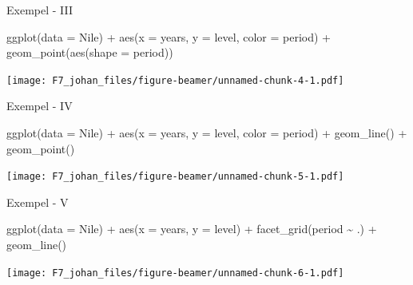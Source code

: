 \documentclass[
  11pt,
  ignorenonframetext,
  handout]{beamer}
\newenvironment{Shaded}{\begin{snugshade}}{\end{snugshade}}
\newcommand{\AttributeTok}[1]{\textcolor[rgb]{0.77,0.63,0.00}{#1}}
\newcommand{\FunctionTok}[1]{\textcolor[rgb]{0.00,0.00,0.00}{#1}}
\newcommand{\NormalTok}[1]{#1}
\newcommand{\SpecialCharTok}[1]{\textcolor[rgb]{0.00,0.00,0.00}{#1}}
\begin{document}
\begin{frame}[fragile]{Exempel - III}
\protect\hypertarget{exempel---iii}{}
\begin{Shaded}
\begin{Highlighting}[]
\FunctionTok{ggplot}\NormalTok{(}\AttributeTok{data =}\NormalTok{ Nile) }\SpecialCharTok{+} 
  \FunctionTok{aes}\NormalTok{(}\AttributeTok{x =}\NormalTok{ years, }\AttributeTok{y =}\NormalTok{ level, }\AttributeTok{color =}\NormalTok{ period) }\SpecialCharTok{+} 
  \FunctionTok{geom\_point}\NormalTok{(}\FunctionTok{aes}\NormalTok{(}\AttributeTok{shape =}\NormalTok{ period))}
\end{Highlighting}
\end{Shaded}

\texttt{[image: F7\_johan\_files/figure-beamer/unnamed-chunk-4-1.pdf]}
\end{frame}

\begin{frame}[fragile]{Exempel - IV}
\protect\hypertarget{exempel---iv}{}
\begin{Shaded}
\begin{Highlighting}[]
\FunctionTok{ggplot}\NormalTok{(}\AttributeTok{data =}\NormalTok{ Nile) }\SpecialCharTok{+} 
  \FunctionTok{aes}\NormalTok{(}\AttributeTok{x =}\NormalTok{ years, }\AttributeTok{y =}\NormalTok{ level, }\AttributeTok{color =}\NormalTok{ period) }\SpecialCharTok{+} 
  \FunctionTok{geom\_line}\NormalTok{() }\SpecialCharTok{+}
  \FunctionTok{geom\_point}\NormalTok{()}
\end{Highlighting}
\end{Shaded}

\texttt{[image: F7\_johan\_files/figure-beamer/unnamed-chunk-5-1.pdf]}
\end{frame}

\begin{frame}[fragile]{Exempel - V}
\protect\hypertarget{exempel---v}{}
\begin{Shaded}
\begin{Highlighting}[]
\FunctionTok{ggplot}\NormalTok{(}\AttributeTok{data =}\NormalTok{ Nile) }\SpecialCharTok{+} 
  \FunctionTok{aes}\NormalTok{(}\AttributeTok{x =}\NormalTok{ years, }\AttributeTok{y =}\NormalTok{ level) }\SpecialCharTok{+} 
  \FunctionTok{facet\_grid}\NormalTok{(period }\SpecialCharTok{\textasciitilde{}}\NormalTok{ .) }\SpecialCharTok{+} 
  \FunctionTok{geom\_line}\NormalTok{()}
\end{Highlighting}
\end{Shaded}

\texttt{[image: F7\_johan\_files/figure-beamer/unnamed-chunk-6-1.pdf]}
\end{frame}
\end{document}
